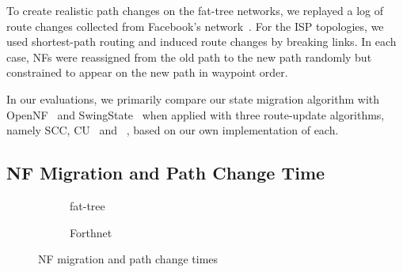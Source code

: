 To create realistic path changes on the fat-tree networks, we replayed
a log of route changes collected from Facebook's
network~\cite{Facebookdata}. For the ISP topologies, we used
shortest-path routing and induced route changes by breaking links.  In
each case, NFs were reassigned from the old path to the new path
randomly but constrained to appear on the new path in waypoint order.

In our evaluations, we primarily compare our state migration algorithm
with OpenNF~\cite{opennf} and SwingState~\cite{swingstate} when
applied with three route-update algorithms, namely SCC,
CU~\cite{CU} and \ourRouteUpdateName~\cite{tsu}, based on our own
implementation of each.

\subsection{NF Migration and Path Change Time}
\begin{figure}[h]
\centering
 \begin{subfigure}[b]{0.79\linewidth}
    \resizebox{\textwidth}{!}{\footnotesize{}}
    \caption{fat-tree}
    \label{fig:time:fat}
  \end{subfigure}
   \begin{subfigure}[b]{0.79\linewidth}
    \resizebox{\textwidth}{!}{\footnotesize{}}
    \caption{Forthnet}
    \label{fig:time:forthnet}
  \end{subfigure}
\caption{NF migration and path change times}
\label{fig:time}
\end{figure}



